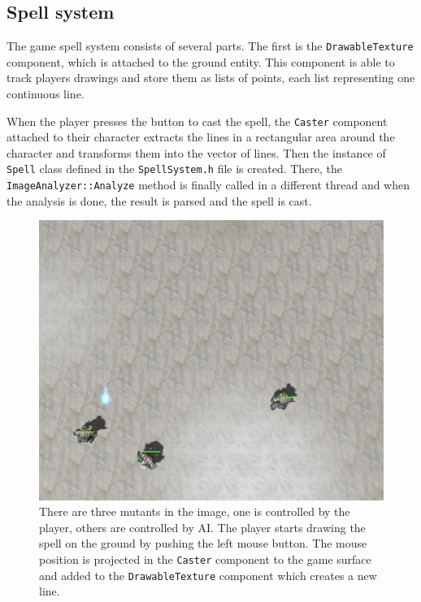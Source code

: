 \subsection{Spell system}
The game spell system consists of several parts. The first is the \texttt{DrawableTexture} component, which is attached to the ground entity. This component is able to track players drawings and store them as lists of points, each list representing one continuous line.

When the player presses the button to cast the spell, the \texttt{Caster} component attached to their character extracts the lines in a rectangular area around the character and transforms them into the vector of lines. Then the instance of \texttt{Spell} class defined in the \texttt{SpellSystem.h} file is created. There, the \texttt{ImageAnalyzer::Analyze} method is finally called in a different thread and when the analysis is done, the result is parsed and the spell is cast.

\begin{figure}[p]
\centering
\includegraphics[width=.6\linewidth]{ext/scr/komix1.png}
\caption{There are three mutants in the image, one is controlled by the player, others are controlled by AI. The player starts drawing the spell on the ground by pushing the left mouse button. The mouse position is projected in the \texttt{Caster} component to the game surface and added to the \texttt{DrawableTexture} component which creates a new line.}
\label{fig:start}
\end{figure}

